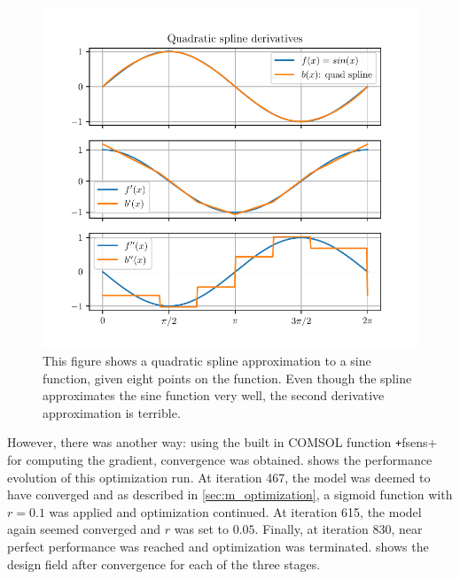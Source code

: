 \begin{figure}[htpb]
	\centering
	\includegraphics{chapters/results/quad_spline_sine.pdf}
	\caption{%
		This figure shows a quadratic spline approximation to a sine function,
		given eight points on the function. Even though the spline approximates
		the sine function very well, the second derivative approximation is
		terrible.
	}%
	\label{fig:quad_spline_sine}
\end{figure}

However, there was another way:
using the built in COMSOL function \texttt+fsens+ for computing
the gradient, convergence was obtained.
 shows the performance evolution of this optimization run.
At iteration 467, the model was deemed to have converged and as described in
\cref{sec:m_optimization}, a sigmoid function with $r=0.1$ was applied and optimization
continued.
At iteration 615, the model again seemed converged and $r$ was set to $0.05$.
Finally, at iteration 830, near perfect performance was reached and optimization
was terminated.
 shows the design field after convergence for each of the
three stages.

